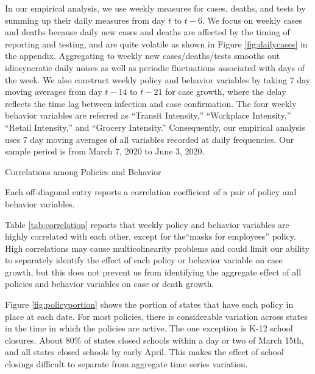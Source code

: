 \documentclass[11pt,reqno,letter]{amsart}
\theoremstyle{definition}
\begin{document}
In our empirical analysis, we use weekly measures for cases, deaths,
and tests by summing up their daily measures from day \(t\) to
\(t-6\).  We focus on weekly cases and deaths because daily new cases and deaths are
affected by the timing of reporting and testing, and are quite
volatile as shown in Figure \ref{fig:dailycases} in the
appendix.  Aggregating to weekly new cases/deaths/tests smooths
out idiosyncratic daily noises as well as periodic fluctuations
associated with days of the week.
We also construct weekly policy and
behavior variables by taking 7 day moving averages from day \(t-14\) to
\(t-21\) for case growth, where the  delay reflects the time lag between infection and case confirmation. The four weekly behavior variables are referred as ``Transit
Intensity,'' ``Workplace Intensity,'' ``Retail Intensity,'' and ``Grocery
Intensity.'' Consequently, our empirical analysis uses 7 day moving averages of all variables recorded at daily frequencies. Our sample period is from March 7, 2020 to June 3, 2020.

\begin{table}\caption{Correlations among Policies and Behavior \label{tab:correlation}}\vspace{-0.2cm}
  \begin{minipage}{\linewidth}
    \resizebox{\linewidth}{!}{
      
    }\smallskip
       \begin{flushleft}
         \scriptsize
         Each off-diagonal entry reports a correlation coefficient of
         a pair of policy and behavior variables.
       \end{flushleft}
  \end{minipage}
\end{table}

Table \ref{tab:correlation} reports that weekly policy and behavior
variables are highly correlated with each other, except for the``masks
for employees'' policy.  High correlations may cause multicolinearity
problems and could limit our ability to separately identify the
effect of each policy or behavior variable on case growth, but this
does not prevent us from identifying the aggregate effect of all
policies and behavior variables on case or death growth.

Figure \ref{fig:policyportion} shows the portion of states that have
each policy in place at each date. For most policies, there is
considerable variation across states in the time in which the policies
are active. The one exception is K-12 school closures. About 80\% of
states closed schools within a day or two of March 15th, and all
states closed schools by early April. This makes the effect of school
closings difficult to separate from aggregate time series variation.
\end{document}
